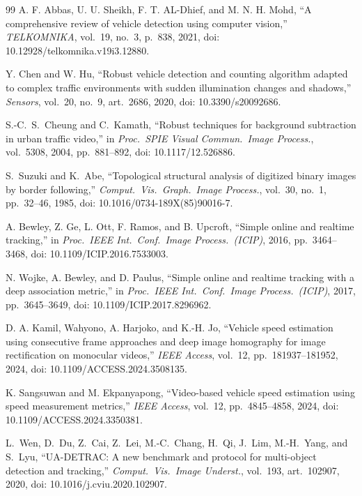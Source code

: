 \documentclass[conference]{IEEEtran}
\begin{document}
\begin{thebibliography}{99}
A. F. Abbas, U. U. Sheikh, F. T. AL-Dhief, and M. N. H. Mohd, ``A
comprehensive review of vehicle detection using computer vision,''
\emph{TELKOMNIKA}, vol.~19, no.~3, p.~838, 2021, doi:
10.12928/telkomnika.v19i3.12880.

Y. Chen and W. Hu, ``Robust vehicle detection and counting algorithm
adapted to complex traffic environments with sudden illumination changes
and shadows,'' \emph{Sensors}, vol.~20, no.~9, art.~2686, 2020, doi:
10.3390/s20092686.

S.-C.\ S.\ Cheung and C.\ Kamath, ``Robust techniques for background
subtraction in urban traffic video,'' in \emph{Proc.\ SPIE Visual
Commun.\ Image Process.}, vol.\ 5308, 2004, pp.\ 881--892, doi:
10.1117/12.526886.

S.\ Suzuki and K.\ Abe, ``Topological structural analysis of digitized
binary images by border following,'' \emph{Comput.\ Vis.\ Graph.\ Image
Process.}, vol.\ 30, no.\ 1, pp.\ 32--46, 1985, doi:
10.1016/0734-189X(85)90016-7.

A. Bewley, Z. Ge, L. Ott, F. Ramos, and B. Upcroft, ``Simple online and
realtime tracking,'' in \emph{Proc.\ IEEE Int.\ Conf.\ Image Process.\
(ICIP)}, 2016, pp.~3464--3468, doi: 10.1109/ICIP.2016.7533003.

N. Wojke, A. Bewley, and D. Paulus, ``Simple online and realtime
tracking with a deep association metric,'' in \emph{Proc.\ IEEE Int.\
Conf.\ Image Process.\ (ICIP)}, 2017, pp.~3645--3649, doi:
10.1109/ICIP.2017.8296962.

D. A. Kamil, Wahyono, A. Harjoko, and K.-H. Jo, ``Vehicle speed
estimation using consecutive frame approaches and deep image homography
for image rectification on monocular videos,'' \emph{IEEE Access},
vol.~12, pp.~181937--181952, 2024, doi: 10.1109/ACCESS.2024.3508135.

\bibitem{sangsuwan2024}
K. Sangsuwan and M. Ekpanyapong, ``Video-based vehicle speed estimation
using speed measurement metrics,'' \emph{IEEE Access}, vol.~12,
pp.~4845--4858, 2024, doi: 10.1109/ACCESS.2024.3350381.

L.\ Wen, D.\ Du, Z.\ Cai, Z.\ Lei, M.-C.\ Chang, H.\ Qi, J.\ Lim,
M.-H.\ Yang, and S.\ Lyu, ``UA-DETRAC: A new benchmark and protocol for
multi-object detection and tracking,'' \emph{Comput.\ Vis.\ Image
Underst.}, vol.\ 193, art.\ 102907, 2020, doi:
10.1016/j.cviu.2020.102907.


\end{thebibliography}
\end{document}
